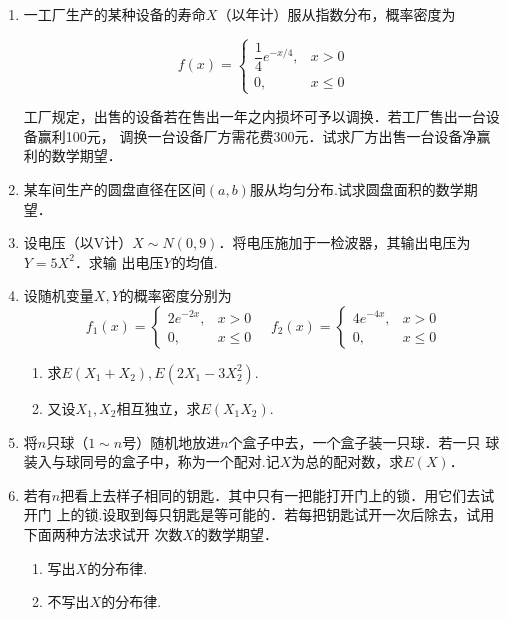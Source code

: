 \documentclass[10pt,a4paper]{article}
\begin{document}
\begin{enumerate}
    \item 一工厂生产的某种设备的寿命$X$（以年计）服从指数分布，概率密度为
    \vspace{-0.5cm}
    \begin{spacing}{2.0}
    $$f(x)=\left\{\begin{array}{ll} 
        \dfrac{1}{4}e^{-x/4}, & x>0\\
        0, & x\leq 0
    \end{array}\right.$$
    \end{spacing}
    \vspace{-0.5cm}
    工厂规定，出售的设备若在售出一年之内损坏可予以调换．若工厂售出一台设备赢利100元，
    调换一台设备厂方需花费300元．试求厂方出售一台设备净赢利的数学期望．
    

    \item 某车间生产的圆盘直径在区间$(a,b)$服从均匀分布.试求圆盘面积的数学期望．
    


    \item 设电压（以V计）$X\sim N(0,9)$．将电压施加于一检波器，其输出电压为$Y=5X^2$．求输
    出电压$Y$的均值.


    \item 设随机变量$X,Y$的概率密度分别为
    $$f_1(x)=\left\{\begin{array}{ll}
        2e^{-2x}, & x>0\\
        0, & x\leq 0
    \end{array}\right.\quad
    f_2(x)=\left\{\begin{array}{ll}
        4e^{-4x}, & x>0\\
        0, & x\leq 0
    \end{array}\right.$$
    \begin{enumerate}
        \item 求$E(X_1+X_2),E(2X_1-3X_2^2)$.
        \item 又设$X_1,X_2$相互独立，求$E(X_1X_2)$.
    \end{enumerate}


    \item 将$n$只球（$1\sim n$号）随机地放进$n$个盒子中去，一个盒子装一只球．若一只
    球装入与球同号的盒子中，称为一个配对.记$X$为总的配对数，求$E(X)$．


    \item 若有$n$把看上去样子相同的钥匙．其中只有一把能打开门上的锁．用它们去试开门
    上的锁.设取到每只钥匙是等可能的．若每把钥匙试开一次后除去，试用下面两种方法求试开
    次数$X$的数学期望．
    \begin{enumerate}
        \item 写出$X$的分布律.
        \item 不写出$X$的分布律.
    \end{enumerate}
    



\end{enumerate}
\end{document}
